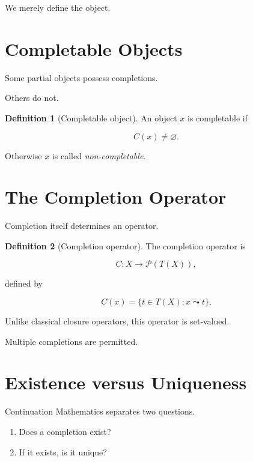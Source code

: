 \documentclass[13pt,openany]{book}
\theoremstyle{plain}
\theoremstyle{definition}
\newtheorem{definition}{Definition}[chapter]
\begin{document}
We merely define the object.


\section{Completable Objects}

Some partial objects possess completions.

Others do not.

\begin{definition}[Completable object]
An object $x$ is completable if

\[
C(x)\neq\varnothing.
\]
\end{definition}

Otherwise $x$ is called
\emph{non-completable}.


\section{The Completion Operator}

Completion itself determines an operator.

\begin{definition}[Completion operator]
The completion operator is

\[
C:X
\longrightarrow
\mathcal P(T(X)),
\]

defined by

\[
C(x)
=
\{t\in T(X):x\leadsto t\}.
\]
\end{definition}

Unlike classical closure operators,
this operator is set-valued.

Multiple completions are permitted.


\section{Existence versus Uniqueness}

Continuation Mathematics separates two questions.

\begin{enumerate}
\item Does a completion exist?
\item If it exists, is it unique?
\end{enumerate}
\end{document}
